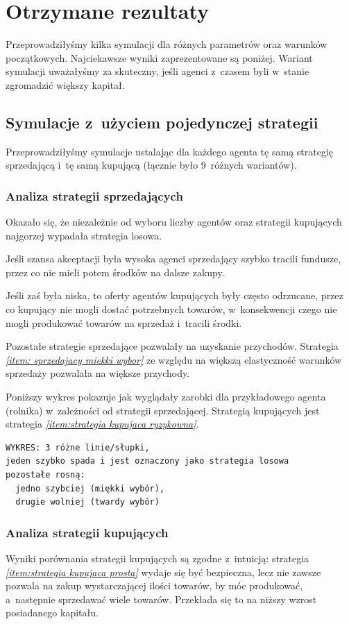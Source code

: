 \documentclass[12pt]{article}
\begin{document}
\section{Otrzymane rezultaty}\label{chapter: rezultaty}
Przeprowadziłyśmy kilka symulacji dla różnych parametrów oraz warunków początkowych. Najciekawsze wyniki zaprezentowane są poniżej. Wariant symulacji uważałyśmy za skuteczny, jeśli agenci z~czasem byli w~stanie zgromadzić
większy kapitał.
\subsection{Symulacje z~użyciem pojedynczej strategii}
Przeprowadziłyśmy symulacje ustalając dla każdego agenta tę samą strategię sprzedającą i~tę samą kupującą (łącznie było 9~różnych wariantów). 
\subsubsection{Analiza strategii sprzedających}
Okazało się, że niezależnie od wyboru liczby agentów oraz strategii kupujących najgorzej wypadała strategia losowa. 

Jeśli szansa akceptacji była wysoka agenci sprzedający szybko tracili fundusze, przez co nie mieli potem
środków na dalsze zakupy. 

Jeśli zaś była niska, to oferty agentów kupujących były często odrzucane, przez co kupujący nie mogli dostać potrzebnych towarów, w~konsekwencji czego nie mogli produkować towarów na sprzedaż i~tracili środki.

Pozostałe strategie sprzedające pozwalały na uzyskanie przychodów. Strategia \emph{\ref{item: sprzedajacy miekki wybor}} ze względu na większą elastyczność warunków sprzedaży pozwalała na większe przychody.

Poniższy wykres pokazuje jak wyglądały zarobki dla przykładowego agenta (rolnika) w~zależności od strategii sprzedającej. Strategią kupujących jest strategia \emph{\ref{item:strategia kupujaca ryzykowna}}.
\begin{verbatim}
WYKRES: 3 różne linie/słupki, 
jeden szybko spada i jest oznaczony jako strategia losowa
pozostałe rosną: 
  jedno szybciej (miękki wybór), 
  drugie wolniej (twardy wybór)
\end{verbatim}

\subsubsection{Analiza strategii kupujących}
Wyniki porównania strategii kupujących są zgodne z~intuicją: strategia \emph{\ref{item:strategia kupujaca prosta}} wydaje się być bezpieczna, lecz nie zawsze pozwala na zakup wystarczającej ilości towarów, by móc produkować,
a~następnie sprzedawać wiele towarów. Przekłada się to na niższy wzrost posiadanego kapitału.
\end{document}
